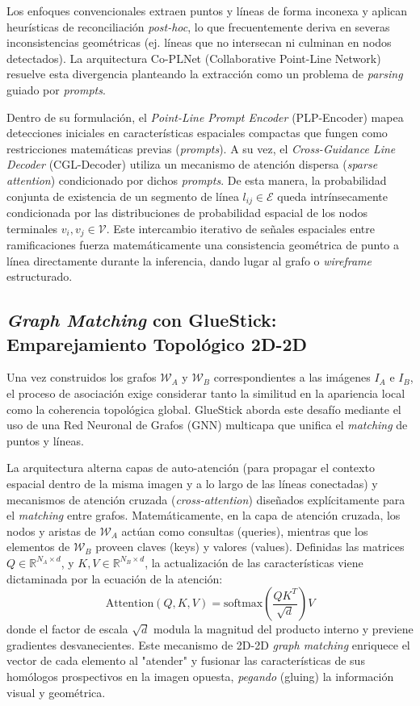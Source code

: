 Los enfoques convencionales extraen puntos y líneas de forma inconexa y aplican heurísticas de reconciliación \textit{post-hoc}, lo que frecuentemente deriva en severas inconsistencias geométricas (ej. líneas que no intersecan ni culminan en nodos detectados). La arquitectura Co-PLNet (Collaborative Point-Line Network) \cite{wang2026coplnet} resuelve esta divergencia planteando la extracción como un problema de \textit{parsing} guiado por \textit{prompts}. 

Dentro de su formulación, el \textit{Point-Line Prompt Encoder} (PLP-Encoder) mapea detecciones iniciales en características espaciales compactas que fungen como restricciones matemáticas previas (\textit{prompts}). A su vez, el \textit{Cross-Guidance Line Decoder} (CGL-Decoder) utiliza un mecanismo de atención dispersa (\textit{sparse attention}) condicionado por dichos \textit{prompts}. De esta manera, la probabilidad conjunta de existencia de un segmento de línea $l_{ij} \in \mathcal{E}$ queda intrínsecamente condicionada por las distribuciones de probabilidad espacial de los nodos terminales $v_i, v_j \in \mathcal{V}$. Este intercambio iterativo de señales espaciales entre ramificaciones fuerza matemáticamente una consistencia geométrica de punto a línea directamente durante la inferencia, dando lugar al grafo o \textit{wireframe} estructurado.

\subsection{\textit{Graph Matching} con GlueStick: Emparejamiento Topológico 2D-2D}
Una vez construidos los grafos $\mathcal{W}_A$ y $\mathcal{W}_B$ correspondientes a las imágenes $I_A$ e $I_B$, el proceso de asociación exige considerar tanto la similitud en la apariencia local como la coherencia topológica global. GlueStick \cite{pelaez2023gluestick} aborda este desafío mediante el uso de una Red Neuronal de Grafos (GNN) multicapa que unifica el \textit{matching} de puntos y líneas.

La arquitectura alterna capas de auto-atención (para propagar el contexto espacial dentro de la misma imagen y a lo largo de las líneas conectadas) y mecanismos de atención cruzada (\textit{cross-attention}) diseñados explícitamente para el \textit{matching} entre grafos. Matemáticamente, en la capa de atención cruzada, los nodos y aristas de $\mathcal{W}_A$ actúan como consultas (queries), mientras que los elementos de $\mathcal{W}_B$ proveen claves (keys) y valores (values). Definidas las matrices $Q \in \mathbb{R}^{N_A \times d}$, y $K, V \in \mathbb{R}^{N_B \times d}$, la actualización de las características viene dictaminada por la ecuación de la atención:
\begin{equation}
    \text{Attention}(Q, K, V) = \text{softmax}\left(\frac{Q K^T}{\sqrt{d}}\right) V
\end{equation}
donde el factor de escala $\sqrt{d}$ modula la magnitud del producto interno y previene gradientes desvanecientes. Este mecanismo de 2D-2D \textit{graph matching} enriquece el vector de cada elemento al "atender" y fusionar las características de sus homólogos prospectivos en la imagen opuesta, \textit{pegando} (gluing) la información visual y geométrica.


